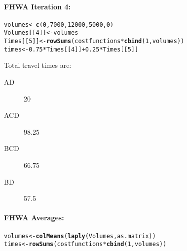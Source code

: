 \documentclass{texMemo}\usepackage[]{graphicx}\usepackage[]{color}
\makeatletter
\newcommand{\hlnum}[1]{\textcolor[rgb]{0.686,0.059,0.569}{#1}}%
\newcommand{\hlopt}[1]{\textcolor[rgb]{0,0,0}{#1}}%
\newcommand{\hlstd}[1]{\textcolor[rgb]{0.345,0.345,0.345}{#1}}%
\newcommand{\hlkwb}[1]{\textcolor[rgb]{0.69,0.353,0.396}{#1}}%
\newcommand{\hlkwd}[1]{\textcolor[rgb]{0.737,0.353,0.396}{\textbf{#1}}}%
\newenvironment{kframe}{%
 \def\at@end@of@kframe{}%
 \ifinner\ifhmode%
  \def\at@end@of@kframe{\end{minipage}}%
  \begin{minipage}{\columnwidth}%
 \fi\fi%
 \def\FrameCommand##1{\hskip\@totalleftmargin \hskip-\fboxsep
 \colorbox{shadecolor}{##1}\hskip-\fboxsep
     \hskip-\linewidth \hskip-\@totalleftmargin \hskip\columnwidth}%
 \MakeFramed {\advance\hsize-\width
   \@totalleftmargin\z@ \linewidth\hsize
   \@setminipage}}%
 {\par\unskip\endMakeFramed%
 \at@end@of@kframe}
\newenvironment{knitrout}{}{} %
\makeatother
\begin{document}
\begin{enumerate}
\paragraph{FHWA Iteration 4:}
\begin{knitrout}\small
{}\color{fgcolor}\begin{kframe}
\begin{alltt}
\hlstd{volumes} \hlkwb{<-} \hlkwd{c}\hlstd{(}\hlnum{0}\hlstd{,}\hlnum{7000}\hlstd{,}\hlnum{12000}\hlstd{,}\hlnum{5000}\hlstd{,}\hlnum{0}\hlstd{)}
\hlstd{Volumes[[}\hlnum{4}\hlstd{]]} \hlkwb{<-} \hlstd{volumes}
\hlstd{Times[[}\hlnum{5}\hlstd{]]} \hlkwb{<-} \hlkwd{rowSums}\hlstd{(costfunctions} \hlopt{*} \hlkwd{cbind}\hlstd{(}\hlnum{1}\hlstd{, volumes))}
\hlstd{times} \hlkwb{<-} \hlnum{0.75} \hlopt{*} \hlstd{Times[[}\hlnum{4}\hlstd{]]} \hlopt{+} \hlnum{0.25} \hlopt{*}\hlstd{Times[[}\hlnum{5}\hlstd{]]}
\end{alltt}
\end{kframe}
\end{knitrout}


\begin{center}
\end{center}
Total travel times are:
\begin{description}
\item[AD]{20}
\item[ACD]{98.25}
\item[BCD]{66.75}
\item[BD]{57.5}
\end{description}

\paragraph{FHWA Averages:}
\begin{knitrout}\small
{}\color{fgcolor}\begin{kframe}
\begin{alltt}
\hlstd{volumes} \hlkwb{<-} \hlkwd{colMeans}\hlstd{(}\hlkwd{laply}\hlstd{(Volumes, as.matrix))}
\hlstd{times} \hlkwb{<-} \hlkwd{rowSums}\hlstd{(costfunctions} \hlopt{*} \hlkwd{cbind}\hlstd{(}\hlnum{1}\hlstd{, volumes))}
\end{alltt}
\end{kframe}
\end{knitrout}



\end{enumerate}
\end{document}
